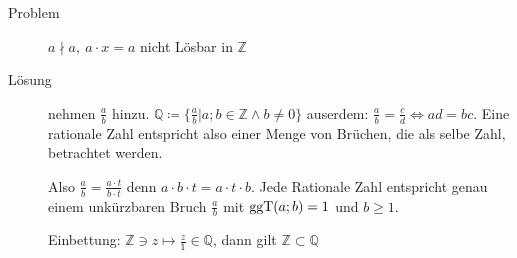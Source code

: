 \begin{description}
    \item[Problem] $a \nmid a,\ a \cdot x = a$ nicht Lösbar in $\mathbb{Z}$
    \item[Lösung] nehmen $\frac{a}{b}$ hinzu. $\mathbb{Q} \coloneqq \lbrace \frac{a}{b} | a;b \in \mathbb{Z} \wedge b \not = 0 \rbrace$ auserdem: $\frac{a}{b} = \frac{c}{d} \Leftrightarrow ad = bc$. Eine rationale Zahl entspricht also einer Menge von Brüchen, die als selbe Zahl, betrachtet werden.

    Also $\frac{a}{b} = \frac{a \cdot t}{b \cdot t}$ denn $a \cdot b \cdot t = a \cdot t \cdot b$. Jede Rationale Zahl entspricht genau einem unkürzbaren Bruch $\frac{a}{b}$ mit $\operatorname{ggT}(a;b) = 1$ und $b \geq 1$.

    Einbettung: $\mathbb{Z}\ni z \longmapsto \frac{z}{1} \in \mathbb{Q}$, dann gilt $\mathbb{Z} \subset \mathbb{Q}$


\end{description}
